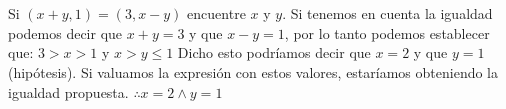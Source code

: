 \section{}
Si $(x + y, 1) = (3, x-y)$ encuentre $x$ y $y$.\newline
Si tenemos en cuenta la igualdad podemos decir que $x + y = 3$ y que $x - y = 1$, por lo tanto podemos establecer que:\newline
$3 > x > 1$ y $x > y \leqslant 1$\newline
Dicho esto podríamos decir que $x = 2$ y que  $y = 1$ (hipótesis). Si valuamos la expresión con estos valores, estaríamos obteniendo la igualdad propuesta.\newline
$\therefore x = 2 \wedge y = 1$